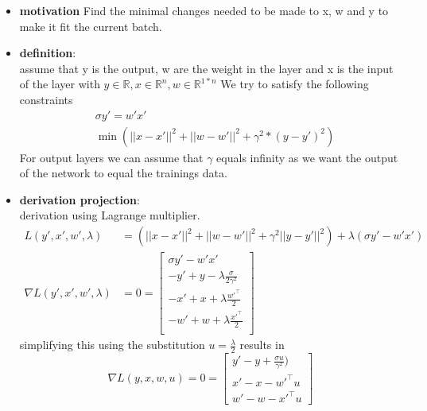 \begin{itemize}
    \item \textbf{motivation}
        Find the minimal changes needed to be made to x, w and y to make it fit the current batch.
    \item \textbf{definition}:\\
    assume that y is the output, w are the weight in the layer and x is the input of the layer with
    $y \in \mathbb{R}, x\in\mathbb{R}^n, w \in  \mathbb{R}^{1*n}$
     We try to satisfy the following constraints
    \begin{equation}
        \begin{split}
            &\sigma y'=w'x'\\
            &\min( ||x-x'||^2 + ||w-w'||^2+\gamma^2*(y-y')^2)
        \end{split}
    \end{equation}
    For output layers we can assume that $\gamma$ equals infinity as we want the output of the network to equal the trainings data.
    \item \textbf{derivation projection}:\\
    derivation using Lagrange multiplier. 
    \begin{equation}
        \begin{split}
            L\left(y',x',w',\lambda\right) &= \left(||x-x'||^2 + ||w-w'||^2+\gamma^2||y-y'||^2\right) +\lambda\left(\sigma y'-w'x'\right) \\
            \nabla L\left(y',x',w',\lambda\right) &=  0=
        \begin{bmatrix}
            \sigma y'-w'x'\\
            -y' + y - \lambda\frac{\sigma}{2 \gamma^2} \\
            -x' + x + \lambda\frac{w'^\top}{2}\\
            -w' + w +\lambda\frac{x'^\top}{2}\\
        \end{bmatrix}
        \end{split}
    \end{equation}
    simplifying this using the substitution $u=\frac{\lambda}{2}$ results in 
    \begin{equation}
        \nabla L\left(y,x,w,u\right) =  0= 
       \begin{bmatrix}
            y'-y  + \frac{\sigma u}{\gamma^2})\\
            x'-x -w'^\top u\\
            w'-w - x'^\top u

\end{bmatrix}
\end{equation}
\end{itemize}
